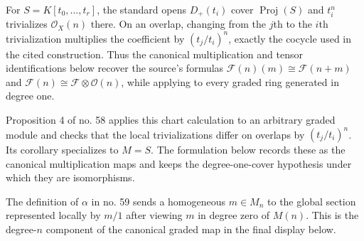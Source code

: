 \begin{lemma}
\label{lemma-apply-modules}
\begin{reference}
\cite[Chapter III, \S 2, no. 54 and Propositions 1 and 2,
pp. 246--247]{FAC}
\cite[Chapter III, \S 2, no. 58, Proposition 4 and Corollary,
pp. 250--251]{FAC}
\cite[Chapter III, \S 2, no. 59, definition of $\alpha$,
p. 252]{FAC}
\cite[Chapter III, \S 3, no. 67, definition of $M^\natural$ and $\alpha$,
p. 260]{FAC}
\end{reference}
\begin{history}
For $S = K[t_0, \ldots, t_r]$, the standard opens $D_{+}(t_i)$ cover
$\operatorname{Proj}(S)$ and $t_i^n$ trivializes $\mathcal{O}_X(n)$ there.
On an overlap, changing from the $j$th to the $i$th trivialization multiplies
the coefficient by $(t_j/t_i)^n$, exactly the cocycle used in the cited
construction. Thus the canonical multiplication and tensor identifications
below recover the source's formulas
$\mathcal{F}(n)(m) \cong \mathcal{F}(n+m)$ and
$\mathcal{F}(n) \cong \mathcal{F} \otimes \mathcal{O}(n)$, while applying
to every graded ring generated in degree one.

Proposition 4 of no. 58 applies this chart calculation to an arbitrary
graded module and checks that the local trivializations differ on overlaps
by $(t_j/t_i)^n$. Its corollary specializes to $M=S$. The formulation below
records these as the canonical multiplication maps and keeps the
degree-one-cover hypothesis under which they are isomorphisms.

The definition of $\alpha$ in no. 59 sends a homogeneous $m \in M_n$
to the global section represented locally by $m/1$ after viewing $m$ in
degree zero of $M(n)$. This is the degree-$n$ component of the canonical
graded map in the final display below.


\end{history}
\end{lemma}
